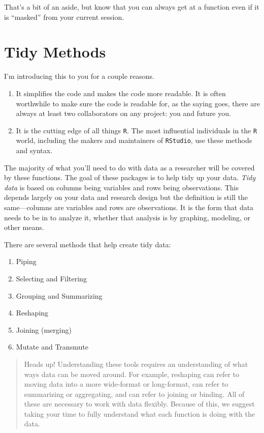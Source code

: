 \documentclass[]{tufte-book}
\providecommand{\tightlist}{%
  \setlength{\itemsep}{0pt}\setlength{\parskip}{0pt}}
\theoremstyle{definition}
\theoremstyle{definition}
\theoremstyle{remark}
\begin{document}
That's a bit of an aside, but know that you can always get at a function
even if it is ``masked'' from your current session.

\section*{Tidy Methods}\label{tidy-methods}

I'm introducing this to you for a couple reasons.

\begin{enumerate}
\def\labelenumi{\arabic{enumi}.}
\tightlist
\item
  It simplifies the code and makes the code more readable. It is often
  worthwhile to make sure the code is readable for, as the saying goes,
  there are always at least two collaborators on any project: you and
  future you.
\item
  It is the cutting edge of all things \texttt{R}. The most influential
  individuals in the \texttt{R} world, including the makers and
  maintainers of \texttt{RStudio}, use these methods and syntax.
\end{enumerate}

The majority of what you'll need to do with data as a researcher will be
covered by these functions. The goal of these packages is to help tidy
up your data. \emph{Tidy data} is based on columns being variables and
rows being observations. This depends largely on your data and research
design but the definition is still the same---columns are variables and
rows are observations. It is the form that data needs to be in to
analyze it, whether that analysis is by graphing, modeling, or other
means.

There are several methods that help create tidy data:

\begin{enumerate}
\def\labelenumi{\arabic{enumi}.}
\tightlist
\item
  Piping
\item
  Selecting and Filtering
\item
  Grouping and Summarizing
\item
  Reshaping
\item
  Joining (merging)
\item
  Mutate and Transmute
\end{enumerate}

\begin{quote}
Heads up! Understanding these tools requires an understanding of what
ways data can be moved around. For example, reshaping can refer to
moving data into a more wide-format or long-format, can refer to
summarizing or aggregating, and can refer to joining or binding. All of
these are necessary to work with data flexibly. Because of this, we
suggest taking your time to fully understand what each function is doing
with the data.
\end{quote}
\end{document}
